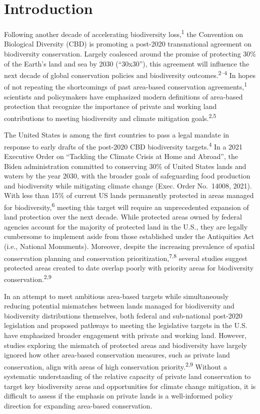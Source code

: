 \documentclass[3p]{elsarticle} %
\begin{document}
\hypertarget{introduction}{%
\section{Introduction}\label{introduction}}

Following another decade of accelerating biodiversity
loss,\textsuperscript{1} the Convention on Biological Diversity (CBD) is
promoting a post-2020 transnational agreement on biodiversity
conservation. Largely coalesced around the promise of protecting 30\% of
the Earth's land and sea by 2030 (``30x30''), this agreement will
influence the next decade of global conservation policies and
biodiversity outcomes.\textsuperscript{2--4} In hopes of not repeating
the shortcomings of past area-based conservation
agreements,\textsuperscript{1} scientists and policymakers have
emphasized modern definitions of area-based protection that recognize
the importance of private and working land contributions to meeting
biodiversity and climate mitigation goals.\textsuperscript{2,5}

The United States is among the first countries to pass a legal mandate
in response to early drafts of the post-2020 CBD biodiversity
targets.\textsuperscript{4} In a 2021 Executive Order on ``Tackling the
Climate Crisis at Home and Abroad'', the Biden administration committed
to conserving 30\% of United States lands and waters by the year 2030,
with the broader goals of safeguarding food production and biodiversity
while mitigating climate change (Exec. Order No.~14008, 2021). With less
than 15\% of current US lands permanently protected in areas managed for
biodiversity,\textsuperscript{6} meeting this target will require an
unprecedented expansion of land protection over the next decade. While
protected areas owned by federal agencies account for the majority of
protected land in the U.S., they are legally cumbersome to implement
aside from those established under the Antiquities Act (i.e., National
Monuments). Moreover, despite the increasing prevalence of spatial
conservation planning and conservation
prioritization,\textsuperscript{7,8} several studies suggest protected
areas created to date overlap poorly with priority areas for
biodiversity conservation.\textsuperscript{2,9}

In an attempt to meet ambitious area-based targets while simultaneously
reducing potential mismatches between lands managed for biodiversity and
biodiversity distributions themselves, both federal and sub-national
post-2020 legislation and proposed pathways to meeting the legislative
targets in the U.S. have emphasized broader engagement with private and
working land. However, studies exploring the mismatch of protected areas
and biodiversity have largely ignored how other area-based conservation
measures, such as private land conservation, align with areas of high
conservation priority.\textsuperscript{2,9} Without a systematic
understanding of the relative capacity of private land conservation to
target key biodiversity areas and opportunities for climate change
mitigation, it is difficult to assess if the emphasis on private lands
is a well-informed policy direction for expanding area-based
conservation.
\end{document}
